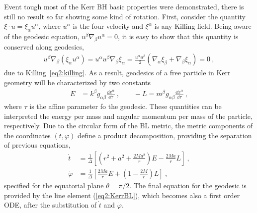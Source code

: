 Event tough most of the Kerr BH basic properties were demonstrated, there is still no result so far showing some kind of rotation.
First, consider the quantity $\xi\cdot u = \xi_\alpha u^\alpha$, where $u^\alpha$ is the four-velocity and $\xi^\alpha$ is any Killing field. 
Being aware of the geodesic equation, $u^\beta \nabla_\beta u^\alpha = 0$, it is easy to show that this quantity is conserved along geodesics,
\begin{align}
    u^\beta \nabla_\beta ( \xi_\alpha u^\alpha ) = u^\alpha u^\beta \nabla_\beta \xi_\alpha = \frac{u^\alpha u^\beta }{2} \left( \nabla_\alpha \xi_\beta + \nabla_\beta \xi_\alpha \right) = 0 ~,
    \label{eq2:geodesicKilling}
\end{align}
due to Killing~\eqref{eq2:killing}.
As a result, geodesics of a free particle in Kerr geometry will be characterized by two constants
\begin{align}
    E &=  k^\beta g_{\alpha\beta} \frac{\dd x^\alpha}{\dd \tau} ~, \qquad -L = m^\beta g_{\alpha\beta} \frac{\dd x^\alpha}{\dd \tau} ~,
    \label{eq2:geodesicConsts}
\end{align}
where $\tau$ is the affine parameter fo the geodesic.
These quantities can be interpreted the energy per mass and angular momentum per mass of the particle, respectively.
Due to the circular form of the BL metric, the metric components of the coordinates $(t,\varphi)$ define a product decomposition, providing the separation of previous equations,
\begin{subequations}
\begin{align}
    \dot{t} &= \frac{1}{\Delta} \left[ (r^2+a^2 +\frac{2 M a^2}{r})E - \frac{2 M a}{r} L \right] ~, \label{eq2:geodesicT} \\
    \dot{\varphi} &= \frac{1}{\Delta} \left[ \frac{2 M a}{r} E +\left( 1- \frac{2 M}{r} \right) L \right]  ~,
    \label{eq2:geodesicPhi}
\end{align}
\end{subequations}
specified for the equatorial plane $\theta=\pi/2$. The final equation for the geodesic is provided by the line element (\ref{eq2:KerrBL}), which becomes also a first order ODE, after the substitution of $\dot{t}$ and $\dot{\varphi}$. 

